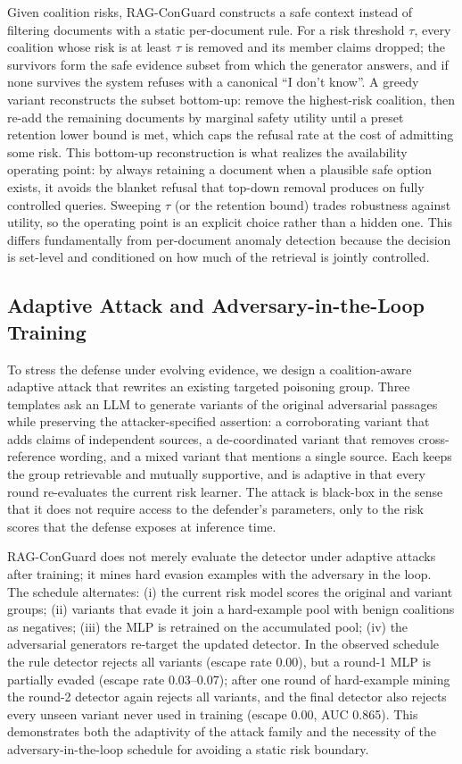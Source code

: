 \documentclass[sigconf]{acmart}
\begin{document}
Given coalition risks, RAG-ConGuard constructs a safe context instead of filtering documents with a static per-document rule. For a risk threshold $\tau$, every coalition whose risk is at least $\tau$ is removed and its member claims dropped; the survivors form the safe evidence subset from which the generator answers, and if none survives the system refuses with a canonical ``I don't know''. A greedy variant reconstructs the subset bottom-up: remove the highest-risk coalition, then re-add the remaining documents by marginal safety utility until a preset retention lower bound is met, which caps the refusal rate at the cost of admitting some risk. This bottom-up reconstruction is what realizes the availability operating point: by always retaining a document when a plausible safe option exists, it avoids the blanket refusal that top-down removal produces on fully controlled queries. Sweeping $\tau$ (or the retention bound) trades robustness against utility, so the operating point is an explicit choice rather than a hidden one. This differs fundamentally from per-document anomaly detection because the decision is set-level and conditioned on how much of the retrieval is jointly controlled.

\subsection{Adaptive Attack and Adversary-in-the-Loop Training}

To stress the defense under evolving evidence, we design a coalition-aware adaptive attack that rewrites an existing targeted poisoning group. Three templates ask an LLM to generate variants of the original adversarial passages while preserving the attacker-specified assertion: a corroborating variant that adds claims of independent sources, a de-coordinated variant that removes cross-reference wording, and a mixed variant that mentions a single source. Each keeps the group retrievable and mutually supportive, and is adaptive in that every round re-evaluates the current risk learner. The attack is black-box in the sense that it does not require access to the defender's parameters, only to the risk scores that the defense exposes at inference time.

RAG-ConGuard does not merely evaluate the detector under adaptive attacks after training; it mines hard evasion examples with the adversary in the loop. The schedule alternates: (i) the current risk model scores the original and variant groups; (ii) variants that evade it join a hard-example pool with benign coalitions as negatives; (iii) the MLP is retrained on the accumulated pool; (iv) the adversarial generators re-target the updated detector. In the observed schedule the rule detector rejects all variants (escape rate 0.00), but a round-1 MLP is partially evaded (escape rate 0.03--0.07); after one round of hard-example mining the round-2 detector again rejects all variants, and the final detector also rejects every unseen variant never used in training (escape 0.00, AUC 0.865). This demonstrates both the adaptivity of the attack family and the necessity of the adversary-in-the-loop schedule for avoiding a static risk boundary.
\end{document}
